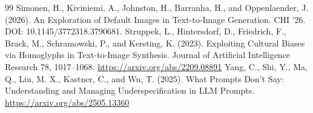 \documentclass[11pt]{article}
\begin{document}
\begin{thebibliography}{99}
 Simonen, H., Kiviniemi, A., Johnston, H., Barranha, H., and Oppenlaender, J. (2026). An Exploration of Default Images in Text-to-Image Generation. CHI '26. DOI: 10.1145/3772318.3790681.
 Struppek, L., Hintersdorf, D., Friedrich, F., Brack, M., Schramowski, P., and Kersting, K. (2023). Exploiting Cultural Biases via Homoglyphs in Text-to-Image Synthesis. Journal of Artificial Intelligence Research 78, 1017--1068. \url{https://arxiv.org/abs/2209.08891}
 Yang, C., Shi, Y., Ma, Q., Liu, M. X., Kastner, C., and Wu, T. (2025). What Prompts Don't Say: Understanding and Managing Underspecification in LLM Prompts. \url{https://arxiv.org/abs/2505.13360}
\end{thebibliography}
\end{document}
